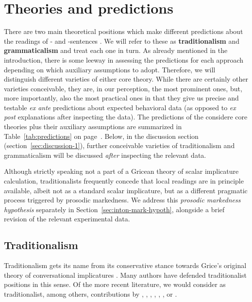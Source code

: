 \documentclass[fleqn,reqno,10pt]{article}
\newcommand{\as}{\acro{as}}
\renewcommand{\es}{\acro{es}}
\renewcommand{\mymark}[1]{\textbf{#1}}
\begin{document}
\section{Theories and predictions}
\label{sec:theories-predictions}

There are two main theoretical positions which make different
predictions about the readings of \as- and \es-sentences
\citep[see][for
overview]{Horn2006:The-Border-Wars,Geurts2010:Quantity-Implic,Sauerland2012:The-Computation,ChemlaSingh2014:Remarks-on-the-}. We
will refer to these as \mymark{traditionalism} and
\mymark{grammaticalism} and treat each one in turn.  As already
mentioned in the introduction, there is some leeway in assessing the
predictions for each approach depending on which auxiliary assumptions
to adopt. Therefore, we will distinguish different varieties of either
core theory. While there are certainly other varieties conceivable,
they are, in our perception, the most prominent ones, but, more
importantly, also the most practical ones in that they give us precise
and testable \emph{ex ante} predictions about expected behavioral data
(as opposed to \emph{ex post} explanations after inspecting the
data). The predictions of the considere core theories plus their
auxiliary assumptions are summarized in Table~\ref{tab:predictions} on
page~\pageref{tab:predictions}. Below, in the discussion section
(section~\ref{sec:discussion-1}), further conceivable varieties of
traditionalism and grammaticalism will be discussed \emph{after}
inspecting the relevant data.


Although strictly speaking not a part of a Gricean theory of scalar
implicature calculation, traditionalists frequently concede that local
readings are in principle available, albeit not as a standard scalar
implicature, but as a different pragmatic process triggered by
prosodic markedness. We address this \emph{prosodic markedness
  hypothesis} separately in Section~\ref{sec:inton-mark-hypoth},
alongside a brief revision of the relevant experimental data.

\subsection{Traditionalism}
\label{sec:traditionalism}

Traditionalism gets its name from its conservative stance towards
Grice's original theory of conversational implicatures
\citep{Grice1975:Logic-and-Conve}. Many authors have defended
traditionalist positions in this sense. Of the more recent literature,
we would consider as traditionalist, among others, contributions by
\citet{Spector2006:Scalar-Implicat},
\citet{Sauerland2004:Scalar-Implicat},
\citet{Russell2006:Against-Grammat},
\citet{vanRooijSchulz:ExhaustiveInterpretation},
\citet{Geurts2010:Quantity-Implic},
\citet{Franke2011:Quantity-Implic}, or \citet{GoodmanStuhlmuller2013:Knowledge-and-I}.
\end{document}
